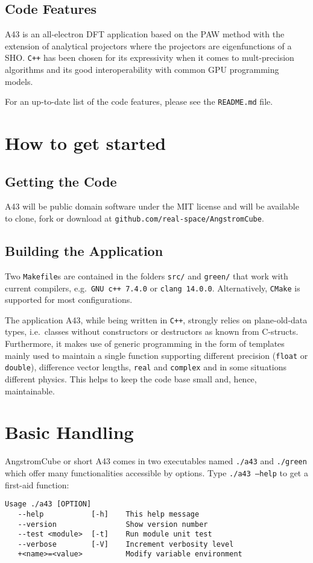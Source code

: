 \documentclass[oribibl]{llncs}
\newcommand{\ttt}[1]{\texttt{#1}}
\newcommand{\fullcodename}{AngstromCube}
\newcommand{\codename}{A43}
\begin{document}
\subsection{Code Features} \label{sec:features}
%
\codename{} is an all-electron \ac{DFT} application 
based on the \ac{PAW} method \cite{PhysRevB.50.17953} %
with the extension of analytical projectors \cite{BaumeisterTsukamoto2019}
where the projectors are eigenfunctions of a \ac{SHO}.
\ttt{C++} has been chosen for its expressivity
when it comes to mult-precision algorithms 
and its good interoperability with common \ac{GPU} programming models.

\noindent
For an up-to-date list of the code features, please see the \ttt{README.md} file.

\section{How to get started} \label{sec:how-to-get-started}
%
\subsection{Getting the Code} \label{sec:getting-the-code}
\codename{} will be public domain software under the MIT license
and will be available to clone, fork or download at \ttt{github.com/real-space/AngstromCube}. 

\subsection{Building the Application} \label{sec:compiling}
%
Two \ttt{Makefile}s are contained in the folders \ttt{src/} and \ttt{green/} that work with current compilers, e.g.~\ttt{GNU c++ 7.4.0} or \ttt{clang 14.0.0}.
Alternatively, \ttt{CMake} is supported for most configurations.

\noindent
The application \codename{}, while being written in \ttt{C++}, strongly relies on plane-old-data types,
i.e.~classes without constructors or destructors as known from C-structs.
Furthermore, it makes use of generic programming in the form of templates
mainly used to maintain a single function supporting different precision (\ttt{float} or \ttt{double}), 
difference vector lengths, \ttt{real} and \ttt{complex} and in some situations different physics.
This helps to keep the code base small and, hence, maintainable.

\section{Basic Handling} \label{sec:basic-handling}
%
\fullcodename{} or short \codename{} comes in two executables named \ttt{./a43} and \ttt{./green} which
offer many functionalities accessible by options. Type \ttt{./a43 --help}
to get a first-aid function:
\begin{verbatim}
Usage ./a43 [OPTION]
   --help           [-h]	This help message
   --version            	Show version number
   --test <module>  [-t]	Run module unit test
   --verbose        [-V]	Increment verbosity level
   +<name>=<value>      	Modify variable environment
\end{verbatim}
\end{document}
